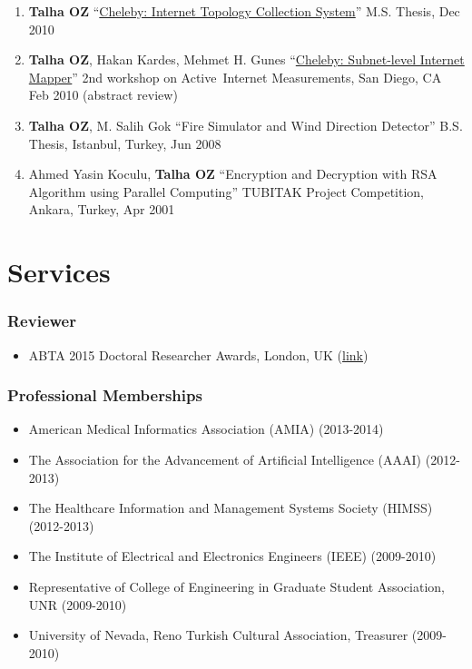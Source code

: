 \documentclass[11pt, letter]{article}
\begin{document}
\begin{raggedright}
\begin{enumerate}
{  An Internet Topology Mapping System}'' 3rd workshop on Active Internet
  Measurements, San Diego, CA Feb 2011 (abstract review)
\item
  \textbf{Talha OZ}
  ``\href{http://www.mli.gmu.edu/toz/publications/MS-Thesis.pdf}{Cheleby:
  Internet Topology Collection System}'' M.S. Thesis, Dec 2010
\item
  \textbf{Talha OZ}, Hakan Kardes, Mehmet H. Gunes
  ``\href{http://www.mli.gmu.edu/toz/publications/2010-AIMS.pdf}{Cheleby:
  Subnet-level Internet Mapper}'' 2nd workshop on Active~Internet
  Measurements, San Diego, CA Feb 2010 (abstract review)
\item
  \textbf{Talha OZ}, M. Salih Gok ``Fire Simulator and Wind Direction
  Detector'' B.S. Thesis, Istanbul, Turkey, Jun 2008
\item
  Ahmed Yasin Koculu, \textbf{Talha OZ} ``Encryption and Decryption with
  RSA Algorithm using Parallel Computing'' TUBITAK Project Competition,
  Ankara, Turkey, Apr 2001
\end{enumerate}

\section{Services}\label{services}

\subsubsection{Reviewer}\label{reviewer}

\begin{itemize}
\itemsep1pt\parskip0pt
\item
  ABTA 2015 Doctoral Researcher Awards, London, UK
  (\href{http://abtanet.org.uk/Awards/Detail/8/2015-ABTA-Doctoral-Researcher-Awards}{link})
\end{itemize}

\subsubsection{Professional Memberships}\label{professional-memberships}

\begin{itemize}
\itemsep1pt\parskip0pt
\item
  American Medical Informatics Association (AMIA) (2013-2014)
\item
  The Association for the Advancement of Artificial Intelligence (AAAI)
  (2012-2013)
\item
  The Healthcare Information and Management Systems Society (HIMSS)
  (2012-2013)
\item
  The Institute of Electrical and Electronics Engineers (IEEE)
  (2009-2010)
\item
  Representative of College of Engineering in Graduate Student
  Association, UNR (2009-2010)
\item
  University of Nevada, Reno Turkish Cultural Association, Treasurer
  (2009-2010)
\end{itemize}


\end{raggedright}
\end{document}
